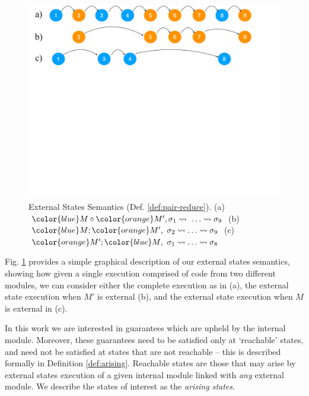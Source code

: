 \begin{figure}[htb]
  \vspace*{-2.5mm}
  \begin{center}
   \begin{minipage}{0.80\textwidth}
     \begin{center}
       \includegraphics[width=\linewidth]{diagrams/VisibleStates.pdf}
     \end{center}
   \end{minipage}
   \end{center}
   \vspace*{-2.5mm}
   \caption{External States Semantics
     (Def. \ref{def:pair-reduce}). %
     (a) $\exec{{\color{blue}M} \circ {\color{orange}M'}}{\sigma_1}{\ldots}\leadsto \sigma_9$
     (b) $\reduction{{\color{blue}M}}{{\color{orange}M'}}{\sigma_2}{\ldots}\leadsto \sigma_9$
     (c) $\reduction{{\color{orange}M'}}{{\color{blue}M}}{\sigma_1}{\ldots}\leadsto \sigma_8$
    }
   \label{fig:VisibleStates}
 \end{figure}
 
Fig. \ref{fig:VisibleStates} provides a simple graphical description of 
our external states semantics, showing how given a single execution 
comprised of code from two different modules, we can consider either
the complete execution as in (a), the external state execution when $M'$ is external (b), and the external state execution when $M$ is external  in (c).
 





In this work we are interested in guarantees which are upheld by the internal 
module. Moreover,    these guarantees  need to be satisfied only at `reachable' states,
and need not be satisfied at states that are
not reachable -- this is described formally in Definition \ref{def:arising}. 
Reachable states are those that  may arise by external states execution
of  a given internal module linked with \emph{any} external module.
We describe the states of interest as the \emph{arising states}. 



